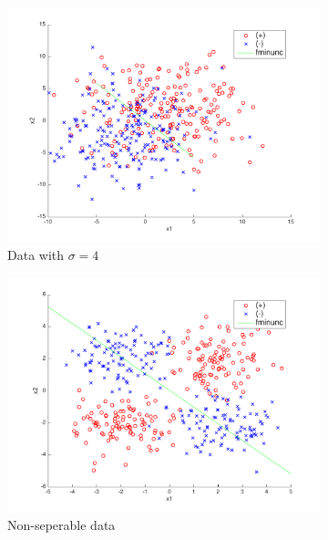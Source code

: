 \begin{figure}[h!]
    \begin{subfigure}[b]{0.4\textwidth}
	\includegraphics[scale=0.4]{hw2_13.pdf}
	\caption{Data with $\sigma = 4$}\label{fig:data_stdev4}
    \end{subfigure}  
    \quad
    \begin{subfigure}[b]{0.4\textwidth}
	\includegraphics[scale=0.4]{hw2_14.pdf}
	\caption{Non-seperable data}\label{fig:data_nonsep}
    \end{subfigure}  
    \caption{}    
\end{figure}

